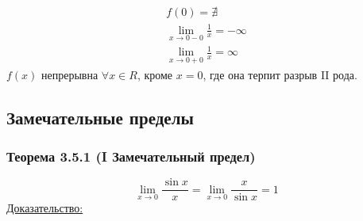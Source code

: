 \documentclass[12pt]{article}
\begin{document}
    \begin{gather*}
        f(0) = \nexists\\
        \lim_{x \to 0-0} \frac{1}{x} = -\infty\\
        \lim_{x \to 0+0} \frac{1}{x} = \infty
    \end{gather*}
    $f(x)$ непрерывна $\forall x \in R$, кроме $x = 0$, где она терпит разрыв II рода.\\

    \subsection{Замечательные пределы}
    \subsubsection*{Теорема 3.5.1 (I Замечательный предел)}\label{th:3.5.1}
    \[ \lim_{x\to 0}\frac{\sin x}{x} = \lim_{x\to 0} \frac{x}{\sin x} = 1 \]\noindent
    \underline{Доказательство:}
\end{document}
